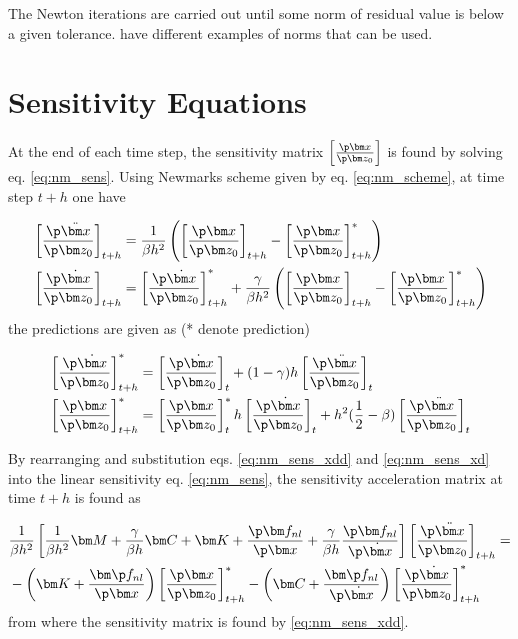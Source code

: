 The Newton iterations are carried out until some norm of residual value is below
a given tolerance. \citet{cook2007concepts} have different examples of norms that
can be used.


\section{Sensitivity Equations}
\label{sec:newmark_sens}


At the end of each time step, the sensitivity matrix $\left[ \frac{\p \bm x}{\p
    \bm z_0} \right]$ is found by solving eq. \eqref{eq:nm_sens}.
Using Newmarks scheme given by eq. \eqref{eq:nm_scheme}, at time step $t+h$ one have

\begin{align}
\label{eq:nm_sens_xdd}
  &\left[ \frac{\p \ddot{\bm x}}{\p \bm z_0} \right]_{t+h} =
    \frac{1}{\beta h^2} \left(
    \left[ \frac{\p \bm x}{\p \bm z_0} \right]_{t+h} -
    \left[ \frac{\p \bm x}{\p \bm z_0} \right]^*_{t+h}
    \right) \\
\label{eq:nm_sens_xd}
  &\left[ \frac{\p \dot{\bm x}}{\p \bm z_0} \right]_{t+h} =
    \left[ \frac{\p \dot{\bm x}}{\p \bm z_0} \right]^*_{t+h} +
    \frac{\gamma}{\beta h^2} \left(
    \left[ \frac{\p \bm x}{\p \bm z_0} \right]_{t+h} -
    \left[ \frac{\p \bm x}{\p \bm z_0} \right]^*_{t+h}
    \right)
\end{align}
the predictions are given as (* denote prediction)

\begin{align}
  \label{eq:nm_sens_predict}
  &\left[ \frac{\p \dot{\bm x}}{\p \bm z_0} \right]^*_{t+h} =
    \left[ \frac{\p \dot{\bm x}}{\p \bm z_0} \right]_{t} +
    (1-\gamma)h \left[ \frac{\p \ddot {\bm x}}{\p \bm z_0} \right]_{t} \\
  &\left[ \frac{\p \bm x}{\p \bm z_0} \right]^*_{t+h} =
    \left[ \frac{\p \bm x}{\p \bm z_0} \right]^*_{t}
    h \left[ \frac{\p \dot {\bm x}}{\p \bm z_0} \right]_{t} +
    h^2(\frac{1}{2} - \beta) \left[ \frac{\p \ddot{\bm x}}{\p \bm z_0} \right]_{t}
\end{align}


By rearranging and substitution eqs. \eqref{eq:nm_sens_xdd} and
\eqref{eq:nm_sens_xd} into the linear sensitivity eq. \eqref{eq:nm_sens}, the
sensitivity acceleration matrix at time $t+h$ is found as

\begin{align}
  &\frac{1}{\beta h^2}
  \left[
    \frac{1}{\beta h^2} \bm M +
    \frac{\gamma}{\beta h} \bm C +
    \bm K +
    \frac{\p \bm f_{nl}}{\p \bm x} +
    \frac{\gamma}{\beta h} \frac{\p \bm f_{nl}}{\p \dot{\bm x}}
  \right]
    \left[ \frac{\p \ddot{\bm x}}{\p \bm z_0} \right]_{t+h} = \nonumber \\
 & -
  \left(\bm K + \frac{\bm \p f_{nl}}{\p \bm x} \right)
  \left[ \frac{\p \bm x}{\p \bm z_0} \right]^*_{t+h}
  -
  \left(\bm C + \frac{\bm \p f_{nl}}{\p \dot {\bm x}} \right)
  \left[ \frac{\p \dot{\bm x}}{\p \bm z_0} \right]^*_{t+h}
  \label{eq:nm_sens_sol}
\end{align}
from where the sensitivity matrix is found by \eqref{eq:nm_sens_xdd}.


